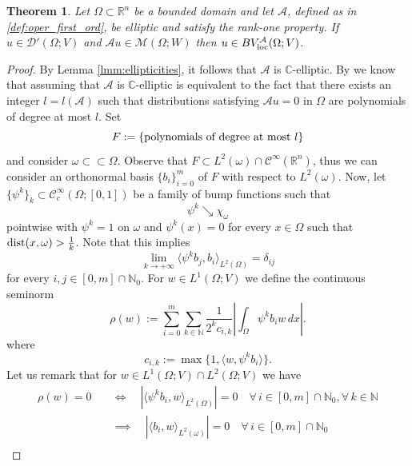 \documentclass[11pt,reqno]{amsart}
\theoremstyle{plain}
\newtheorem{theorem}{Theorem}[section]
\theoremstyle{definition}
\theoremstyle{remark}
\numberwithin{equation}{section}
\newcommand{\R}{\mathbb{R}}
\newcommand{\C}{\mathbb{C}}
\newcommand{\N}{\mathbb{N}}
\newcommand{\M}{\mathcal{M}}
\newcommand{\A}{\mathcal{A}}
\newcommand{\D}{\mathcal{D}}
\newcommand{\1}{\mathbbm{1}} %
\newcommand{\loc}{\textnormal{loc}}
\newcommand{\dist}{\textnormal{dist}}
\begin{document}
\begin{theorem}
\label{thm:local_reg}
    Let $\Omega \subset \R^n$ be a bounded domain and let $\A$, defined as in \eqref{def:oper_first_ord}, be elliptic and satisfy the rank-one property. If $u \in \D'(\Omega; V)$ and $\A u \in \M(\Omega; W)$ then $u \in BV_\loc^\A(\Omega; V)$.
\end{theorem}
\begin{proof}
    By Lemma \ref{lmm:ellipticities}, it follows that $\A$ is $\C$-elliptic. By \cite[Proposition 3.1]{GR19_0} we know that assuming that $\A$ is $\C$-elliptic is equivalent to the fact that there exists an integer $l = l(\A)$ such that distributions satisfying $\A u = 0$ in $\Omega$ are polynomials of degree at most $l$. Set
    \begin{equation*}
        F := \{ \textnormal{polynomials of degree at most } l \}
    \end{equation*}
    and consider $\omega \subset \subset \Omega$. Observe that $F \subset L^2(\omega) \cap \mathcal{C}^\infty(\R^n)$, thus we can consider an orthonormal basis $\{b_i\}_{i = 0}^m$ of $F$ with respect to $L^2(\omega)$. Now, let $\{\psi^k\}_k \subset \mathcal{C}^\infty_c(\Omega; [0,1])$ be a family of bump functions such that 
    $$
        \psi^k \searrow \chi_\omega
    $$
    pointwise with $\psi^k = 1$ on $\omega$ and $\psi^k(x) = 0$ for every $x \in \Omega$ such that $\dist(x,\omega) > \tfrac{1}{k}$. Note that this implies
    \begin{equation*}
        \lim_{k \to +\infty} \langle \psi^k b_j, b_i \rangle_{L^2(\Omega)} = \delta_{ij}
    \end{equation*}
    for every $i,j \in [0,m] \cap \N_0$. For $w \in L^1(\Omega; V)$ we define the continuous seminorm 
    \begin{equation*}
        \rho(w) := \sum_{i = 0}^m \sum_{k \in \N} \frac{1}{2^kc_{i,k}} \left| \int_\Omega \psi^k b_iw \, dx \right|.
    \end{equation*}
    where 
    \[
        c_{i,k} := \max\{1, \langle w, \psi^k b_i \rangle\}.
    \]
    Let us remark that for $w \in L^1(\Omega;V) \cap L^2(\Omega; V)$ we have
    \begin{equation*}
    \begin{aligned}
        \rho(w) = 0
        &\quad \iff \quad | \langle \psi^k b_i, w \rangle_{L^2(\Omega)} | = 0 \quad \forall \, i \in [0,m] \cap \N_0, \forall \, k \in \N \\
        &\quad \implies \quad | \langle b_i, w \rangle_{L^2(\omega)} | = 0 \quad \forall \, i \in [0,m] \cap \N_0 \\

\end{aligned}
\end{equation*}
\end{proof}
\end{document}
